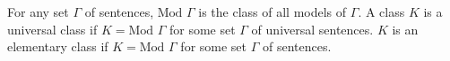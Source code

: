 For any set $\Gamma$ of sentences, $\text{Mod } \Gamma$ is the class of all models of $\Gamma$. A class $K$ is a universal class if $K = \text{Mod } \Gamma$ for some set $\Gamma$ of universal sentences. $K$ is an elementary class if $K = \text{Mod } \Gamma$ for some set $\Gamma$ of sentences.
